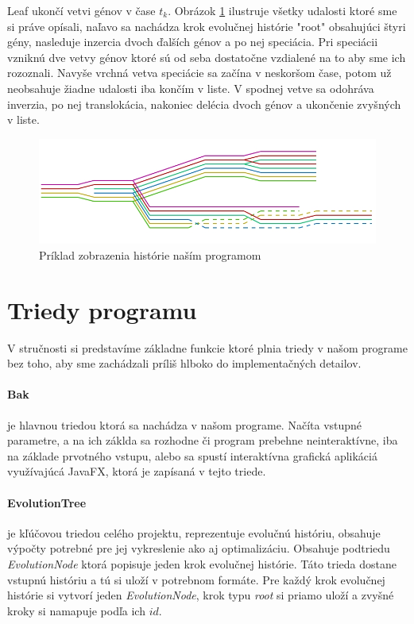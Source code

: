 Leaf ukončí vetvi génov v čase $t_k$.\newline
Obrázok \ref{obr:events} ilustruje všetky udalosti ktoré sme si práve opísali, naľavo sa nachádza krok evolučnej histórie "root" obsahujúci štyri gény,
nasleduje inzercia dvoch ďalších génov a po nej speciácia. Pri speciácii vzniknú dve vetvy génov ktoré sú od seba dostatočne vzdialené na to aby sme ich rozoznali.
Navyše vrchná vetva speciácie sa začína v neskoršom čase, potom už neobsahuje žiadne udalosti iba končím v liste.
V spodnej vetve sa odohráva inverzia, po nej translokácia, nakoniec delécia dvoch génov a ukončenie zvyšných v liste.
\begin{figure}
\centerline{\includegraphics[width=1\textwidth]{images/udalosti}}
\caption{Príklad zobrazenia histórie naším programom}\label{obr:events}
\end{figure}
\section{Triedy programu}
V stručnosti si predstavíme základne funkcie ktoré plnia triedy v našom programe bez toho, aby sme zachádzali príliš hlboko do implementačných detailov.
\paragraph{Bak} je hlavnou triedou ktorá sa nachádza v našom programe.
Načíta vstupné parametre, a na ich záklda sa rozhodne či program prebehne neinteraktívne, iba na základe prvotného vstupu, 
alebo sa spustí interaktívna grafická aplikáciá využívajúcá JavaFX, ktorá je zapísaná v tejto triede.
\paragraph{EvolutionTree} je kľúčovou triedou celého projektu, reprezentuje evolučnú históriu, obsahuje výpočty potrebné pre jej vykreslenie ako aj optimalizáciu. Obsahuje podtriedu \emph{EvolutionNode} 
ktorá popisuje jeden krok evolučnej histórie. Táto trieda dostane vstupnú históriu a tú si uloží v potrebnom formáte.
Pre každý krok evolučnej histórie si vytvorí jeden \emph{EvolutionNode}, krok typu \emph{root} si priamo uloží a zvyšné kroky si namapuje podľa ich $id$.

